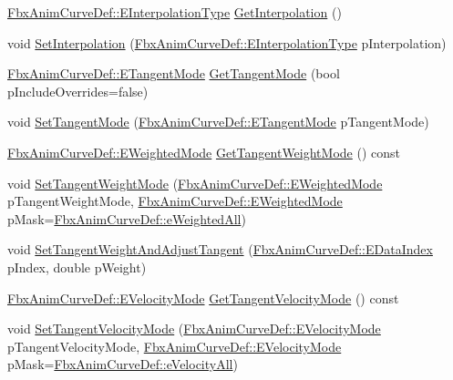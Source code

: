 \begin{DoxyCompactItemize}
\hyperlink{class_fbx_anim_curve_def_add2ab7d10d856ab0868cc9b143d59ea5}{Fbx\+Anim\+Curve\+Def\+::\+E\+Interpolation\+Type} \hyperlink{class_fbx_anim_curve_key_afe707d042861d5f6d5e22f4811a725ac}{Get\+Interpolation} ()
\item 
void \hyperlink{class_fbx_anim_curve_key_a10777e9392725191bd6ab1d425460406}{Set\+Interpolation} (\hyperlink{class_fbx_anim_curve_def_add2ab7d10d856ab0868cc9b143d59ea5}{Fbx\+Anim\+Curve\+Def\+::\+E\+Interpolation\+Type} p\+Interpolation)
\item 
\hyperlink{class_fbx_anim_curve_def_ac810ccc5ca0527704ab5175479964b87}{Fbx\+Anim\+Curve\+Def\+::\+E\+Tangent\+Mode} \hyperlink{class_fbx_anim_curve_key_a3821c01c7e1b422efcf2fedd074ffb6a}{Get\+Tangent\+Mode} (bool p\+Include\+Overrides=false)
\item 
void \hyperlink{class_fbx_anim_curve_key_a8a8a090694fc042e9b234e40918faf8e}{Set\+Tangent\+Mode} (\hyperlink{class_fbx_anim_curve_def_ac810ccc5ca0527704ab5175479964b87}{Fbx\+Anim\+Curve\+Def\+::\+E\+Tangent\+Mode} p\+Tangent\+Mode)
\item 
\hyperlink{class_fbx_anim_curve_def_aeee6e9cc12501e10dbd3e5caaf66990e}{Fbx\+Anim\+Curve\+Def\+::\+E\+Weighted\+Mode} \hyperlink{class_fbx_anim_curve_key_a6971443814d64229442becc934315c56}{Get\+Tangent\+Weight\+Mode} () const
\item 
void \hyperlink{class_fbx_anim_curve_key_a418159da0643ccdbeb5aa59b69b821e0}{Set\+Tangent\+Weight\+Mode} (\hyperlink{class_fbx_anim_curve_def_aeee6e9cc12501e10dbd3e5caaf66990e}{Fbx\+Anim\+Curve\+Def\+::\+E\+Weighted\+Mode} p\+Tangent\+Weight\+Mode, \hyperlink{class_fbx_anim_curve_def_aeee6e9cc12501e10dbd3e5caaf66990e}{Fbx\+Anim\+Curve\+Def\+::\+E\+Weighted\+Mode} p\+Mask=\hyperlink{class_fbx_anim_curve_def_aeee6e9cc12501e10dbd3e5caaf66990ea4337e6853fab642c2a432ab1bb303922}{Fbx\+Anim\+Curve\+Def\+::e\+Weighted\+All})
\item 
void \hyperlink{class_fbx_anim_curve_key_a9ea49dd21bb571575005dd678ecba501}{Set\+Tangent\+Weight\+And\+Adjust\+Tangent} (\hyperlink{class_fbx_anim_curve_def_a3be261d961f8226235529b148cf80300}{Fbx\+Anim\+Curve\+Def\+::\+E\+Data\+Index} p\+Index, double p\+Weight)
\item 
\hyperlink{class_fbx_anim_curve_def_a747576beffa78ab236d2e140da395fff}{Fbx\+Anim\+Curve\+Def\+::\+E\+Velocity\+Mode} \hyperlink{class_fbx_anim_curve_key_af8b7bc72b42857f9a713ca3f443cd55b}{Get\+Tangent\+Velocity\+Mode} () const
\item 
void \hyperlink{class_fbx_anim_curve_key_a758b05baef1e6298833b1ed9e6c11a3e}{Set\+Tangent\+Velocity\+Mode} (\hyperlink{class_fbx_anim_curve_def_a747576beffa78ab236d2e140da395fff}{Fbx\+Anim\+Curve\+Def\+::\+E\+Velocity\+Mode} p\+Tangent\+Velocity\+Mode, \hyperlink{class_fbx_anim_curve_def_a747576beffa78ab236d2e140da395fff}{Fbx\+Anim\+Curve\+Def\+::\+E\+Velocity\+Mode} p\+Mask=\hyperlink{class_fbx_anim_curve_def_a747576beffa78ab236d2e140da395fffab8603ba4ecc238f5dee7489b6a0123ee}{Fbx\+Anim\+Curve\+Def\+::e\+Velocity\+All})

\end{DoxyCompactItemize}
